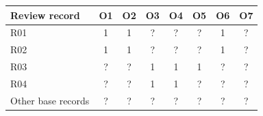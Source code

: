 \begin{tabular}{lccccccc}
\toprule
Review record & O1 & O2 & O3 & O4 & O5 & O6 & O7 \\
\midrule
R01 \cite{repack} & 1 & 1 & ? & ? & ? & 1 & ? \\
R02 \cite{tpl} & 1 & 1 & ? & ? & ? & 1 & ? \\
R03 \cite{astra} & ? & ? & 1 & 1 & 1 & ? & ? \\
R04 \cite{properties} & ? & ? & 1 & 1 & ? & ? & ? \\
Other base records & ? & ? & ? & ? & ? & ? & ? \\
\bottomrule
\end{tabular}
